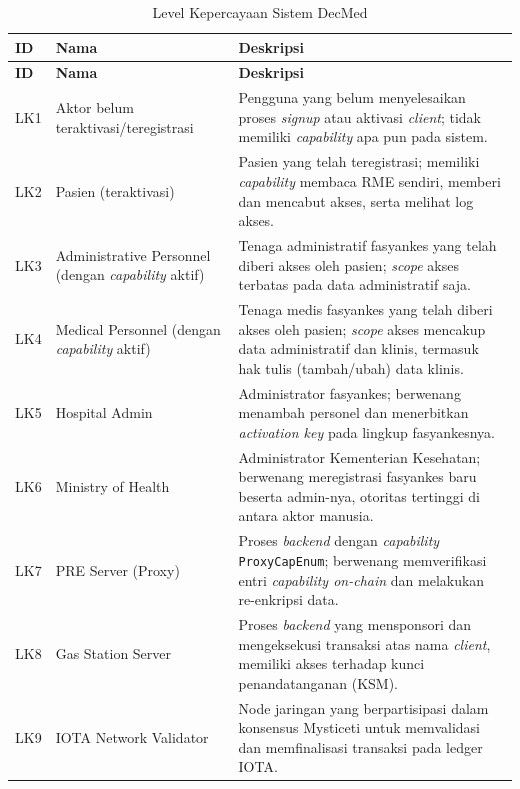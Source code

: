 \begin{xltabular}{\textwidth}{|>{\centering\arraybackslash}p{1.2cm}|>{\raggedright\arraybackslash}p{3.3cm}|X|}
    \caption{Level Kepercayaan Sistem DecMed}
    \label{tab:trust-level} \\
    \hline
    \textbf{ID} & \textbf{Nama} & \textbf{Deskripsi} \\
    \hline
    \endfirsthead
    \hline
    \textbf{ID} & \textbf{Nama} & \textbf{Deskripsi} \\
    \hline
    \endhead
    \hline
    \endfoot
    \hline
    \endlastfoot

    LK1 & Aktor belum teraktivasi/teregistrasi & Pengguna yang belum menyelesaikan proses \textit{signup} atau aktivasi \textit{client}; tidak memiliki \textit{capability} apa pun pada sistem. \\
    \hline

    LK2 & Pasien (teraktivasi) & Pasien yang telah teregistrasi; memiliki \textit{capability} membaca RME sendiri, memberi dan mencabut akses, serta melihat log akses. \\
    \hline

    LK3 & Administrative Personnel (dengan \textit{capability} aktif) & Tenaga administratif fasyankes yang telah diberi akses oleh pasien; \textit{scope} akses terbatas pada data administratif saja. \\
    \hline

    LK4 & Medical Personnel (dengan \textit{capability} aktif) & Tenaga medis fasyankes yang telah diberi akses oleh pasien; \textit{scope} akses mencakup data administratif dan klinis, termasuk hak tulis (tambah/ubah) data klinis. \\
    \hline

    LK5 & Hospital Admin & Administrator fasyankes; berwenang menambah personel dan menerbitkan \textit{activation key} pada lingkup fasyankesnya. \\
    \hline

    LK6 & Ministry of Health & Administrator Kementerian Kesehatan; berwenang meregistrasi fasyankes baru beserta admin-nya, otoritas tertinggi di antara aktor manusia. \\
    \hline

    LK7 & PRE Server (Proxy) & Proses \textit{backend} dengan \textit{capability} \texttt{ProxyCapEnum}; berwenang memverifikasi entri \textit{capability on-chain} dan melakukan re-enkripsi data. \\
    \hline

    LK8 & Gas Station Server & Proses \textit{backend} yang mensponsori dan mengeksekusi transaksi atas nama \textit{client}, memiliki akses terhadap kunci penandatanganan (KSM). \\
    \hline

    LK9 & IOTA Network Validator & Node jaringan yang berpartisipasi dalam konsensus Mysticeti untuk memvalidasi dan memfinalisasi transaksi pada ledger IOTA. \\
    \hline

\end{xltabular}

